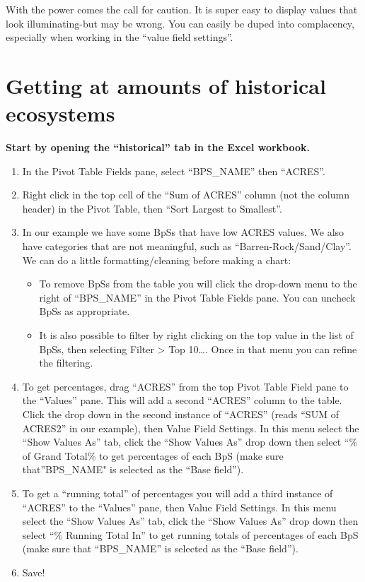 \documentclass[
]{book}
\providecommand{\tightlist}{%
  \setlength{\itemsep}{0pt}\setlength{\parskip}{0pt}}
\begin{document}
With the power comes the call for caution. It is super easy to display values that look illuminating-but may be wrong. You can easily be duped into complacency, especially when working in the ``value field settings''.

\hypertarget{getting-at-amounts-of-historical-ecosystems}{%
\section{Getting at amounts of historical ecosystems}\label{getting-at-amounts-of-historical-ecosystems}}

\textbf{Start by opening the ``historical'' tab in the Excel workbook.}

\begin{enumerate}
\def\labelenumi{\arabic{enumi}.}
\tightlist
\item
  In the Pivot Table Fields pane, select ``BPS\_NAME'' then ``ACRES''.\\
\item
  Right click in the top cell of the ``Sum of ACRES'' column (not the column header) in the Pivot Table, then ``Sort Largest to Smallest''.
\item
  In our example we have some BpSs that have low ACRES values. We also have categories that are not meaningful, such as ``Barren-Rock/Sand/Clay''. We can do a little formatting/cleaning before making a chart:

  \begin{itemize}
  \tightlist
  \item
    To remove BpSs from the table you will click the drop-down menu to the right of ``BPS\_NAME'' in the Pivot Table Fields pane. You can uncheck BpSs as appropriate.
  \item
    It is also possible to filter by right clicking on the top value in the list of BpSs, then selecting Filter \textgreater{} Top 10\ldots. Once in that menu you can refine the filtering.
  \end{itemize}
\item
  To get percentages, drag ``ACRES'' from the top Pivot Table Field pane to the ``Values'' pane. This will add a second ``ACRES'' column to the table. Click the drop down in the second instance of ``ACRES'' (reads ``SUM of ACRES2'' in our example), then Value Field Settings. In this menu select the ``Show Values As'' tab, click the ``Show Values As'' drop down then select ``\% of Grand Total\% to get percentages of each BpS (make sure that''BPS\_NAME" is selected as the ``Base field'').\\
\item
  To get a ``running total'' of percentages you will add a third instance of ``ACRES'' to the ``Values'' pane, then Value Field Settings. In this menu select the ``Show Values As'' tab, click the ``Show Values As'' drop down then select ``\% Running Total In'' to get running totals of percentages of each BpS (make sure that ``BPS\_NAME'' is selected as the ``Base field'').
\item
  Save!
\end{enumerate}
\end{document}
